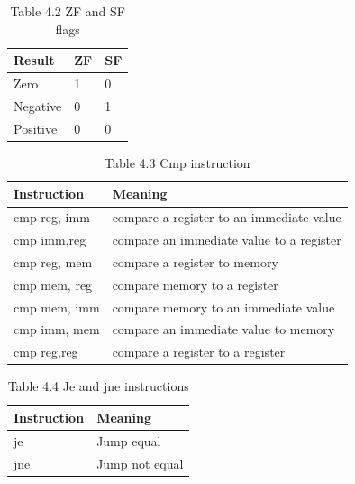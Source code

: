 \documentclass[10pt]{book}
\begin{document}
\begin{table}[htbp]
\begin{center}
\captionsetup{labelformat=empty}
\caption{Table 4.2 ZF and SF flags}
\begin{tabular}{|l|l|l|}
\hline
Result & ZF & SF \\
\hline
Zero & 1 & 0 \\
\hline
Negative & 0 & 1 \\
\hline
Positive & 0 & 0 \\
\hline
\end{tabular}
\end{center}
\end{table}

\begin{table}[htbp]
\begin{center}
\captionsetup{labelformat=empty}
\caption{Table 4.3 Cmp instruction}
\begin{tabular}{|l|l|}
\hline
Instruction & Meaning \\
\hline
cmp reg, imm & compare a register to an immediate value \\
\hline
cmp imm,reg & compare an immediate value to a register \\
\hline
cmp reg, mem & compare a register to memory \\
\hline
cmp mem, reg & compare memory to a register \\
\hline
cmp mem, imm & compare memory to an immediate value \\
\hline
cmp imm, mem & compare an immediate value to memory \\
\hline
cmp reg,reg & compare a register to a register \\
\hline
\end{tabular}
\end{center}
\end{table}

\begin{table}[htbp]
\begin{center}
\captionsetup{labelformat=empty}
\caption{Table 4.4 Je and jne instructions}
\begin{tabular}{|l|l|}
\hline
Instruction & Meaning \\

\hline
je & Jump equal \\
\hline
jne & Jump not equal \\
\hline
\end{tabular}
\end{center}
\end{table}
\end{document}
